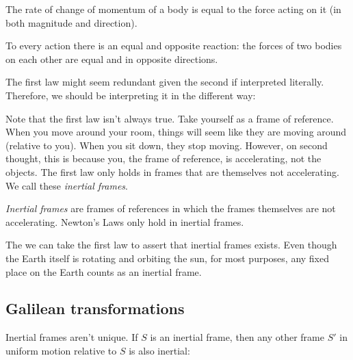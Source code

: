 \documentclass[a4paper]{article}
\begin{document}
\begin{law}
   The rate of change of momentum of a body is equal to the force acting on it (in both magnitude and direction).
\end{law}

\begin{law}
  To every action there is an equal and opposite reaction: the forces of two bodies on each other are equal and in opposite directions.
\end{law}
The first law might seem redundant given the second if interpreted literally. Therefore, we should be interpreting it in the different way:

Note that the first law isn't always true. Take yourself as a frame of reference. When you move around your room, things will seem like they are moving around (relative to you). When you sit down, they stop moving. However, on second thought, this is because you, the frame of reference, is accelerating, not the objects. The first law only holds in frames that are themselves not accelerating. We call these \emph{inertial frames}.
\begin{defi}
  \emph{Inertial frames} are frames of references in which the frames themselves are not accelerating. Newton's Laws only hold in inertial frames.
\end{defi}
The we can take the first law to assert that inertial frames exists. Even though the Earth itself is rotating and orbiting the sun, for most purposes, any fixed place on the Earth counts as an inertial frame.

\subsection{Galilean transformations}
Inertial frames aren't unique. If $S$ is an inertial frame, then any other frame $S'$ in uniform motion relative to $S$ is also inertial:
\begin{center}
\end{center}
\end{document}
